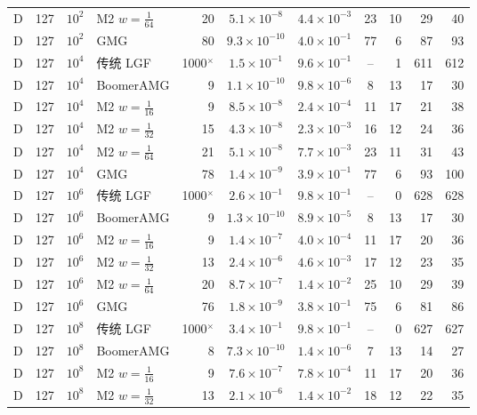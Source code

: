 \begin{longtable}{lrrlrcccrrr}
D & 127 & $10^{2}$ & M2 $w{=}\frac1{64}$ & 20 & $5.1{\times}10^{-8}$ & $4.4{\times}10^{-3}$ & 23 & 10 & 29 & 40 \\
D & 127 & $10^{2}$ & GMG & 80 & $9.3{\times}10^{-10}$ & $4.0{\times}10^{-1}$ & 77 & 6 & 87 & 93 \\
D & 127 & $10^{4}$ & 传统 LGF & 1000$^\times$ & $1.5{\times}10^{-1}$ & $9.6{\times}10^{-1}$ & -- & 1 & 611 & 612 \\
D & 127 & $10^{4}$ & BoomerAMG & 9 & $1.1{\times}10^{-10}$ & $9.8{\times}10^{-6}$ & 8 & 13 & 17 & 30 \\
D & 127 & $10^{4}$ & M2 $w{=}\frac1{16}$ & 9 & $8.5{\times}10^{-8}$ & $2.4{\times}10^{-4}$ & 11 & 17 & 21 & 38 \\
D & 127 & $10^{4}$ & M2 $w{=}\frac1{32}$ & 15 & $4.3{\times}10^{-8}$ & $2.3{\times}10^{-3}$ & 16 & 12 & 24 & 36 \\
D & 127 & $10^{4}$ & M2 $w{=}\frac1{64}$ & 21 & $5.1{\times}10^{-8}$ & $7.7{\times}10^{-3}$ & 23 & 11 & 31 & 43 \\
D & 127 & $10^{4}$ & GMG & 78 & $1.4{\times}10^{-9}$ & $3.9{\times}10^{-1}$ & 77 & 6 & 93 & 100 \\
D & 127 & $10^{6}$ & 传统 LGF & 1000$^\times$ & $2.6{\times}10^{-1}$ & $9.8{\times}10^{-1}$ & -- & 0 & 628 & 628 \\
D & 127 & $10^{6}$ & BoomerAMG & 9 & $1.3{\times}10^{-10}$ & $8.9{\times}10^{-5}$ & 8 & 13 & 17 & 30 \\
D & 127 & $10^{6}$ & M2 $w{=}\frac1{16}$ & 9 & $1.4{\times}10^{-7}$ & $4.0{\times}10^{-4}$ & 11 & 17 & 20 & 36 \\
D & 127 & $10^{6}$ & M2 $w{=}\frac1{32}$ & 13 & $2.4{\times}10^{-6}$ & $4.6{\times}10^{-3}$ & 17 & 12 & 23 & 35 \\
D & 127 & $10^{6}$ & M2 $w{=}\frac1{64}$ & 20 & $8.7{\times}10^{-7}$ & $1.4{\times}10^{-2}$ & 25 & 10 & 29 & 39 \\
D & 127 & $10^{6}$ & GMG & 76 & $1.8{\times}10^{-9}$ & $3.8{\times}10^{-1}$ & 75 & 6 & 81 & 86 \\
D & 127 & $10^{8}$ & 传统 LGF & 1000$^\times$ & $3.4{\times}10^{-1}$ & $9.8{\times}10^{-1}$ & -- & 0 & 627 & 627 \\
D & 127 & $10^{8}$ & BoomerAMG & 8 & $7.3{\times}10^{-10}$ & $1.4{\times}10^{-6}$ & 7 & 13 & 14 & 27 \\
D & 127 & $10^{8}$ & M2 $w{=}\frac1{16}$ & 9 & $7.6{\times}10^{-7}$ & $7.8{\times}10^{-4}$ & 11 & 17 & 20 & 36 \\
D & 127 & $10^{8}$ & M2 $w{=}\frac1{32}$ & 13 & $2.1{\times}10^{-6}$ & $1.4{\times}10^{-2}$ & 18 & 12 & 22 & 35 \\

\end{longtable}
